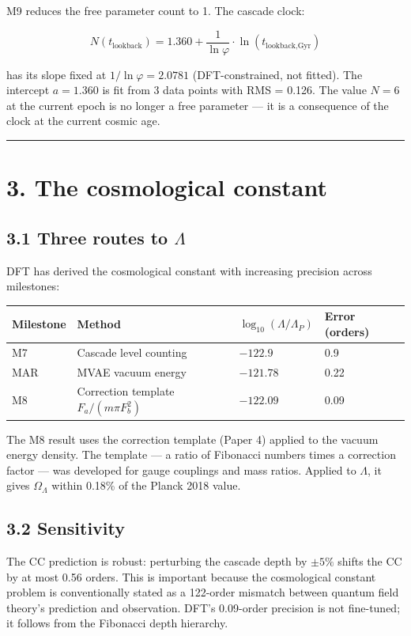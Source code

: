 \documentclass[11pt,a4paper]{article}
\begin{document}
M9 reduces the free parameter count to 1. The cascade clock:

\[N(t_{\text{lookback}}) = 1.360 + \frac{1}{\ln\varphi} \cdot \ln(t_{\text{lookback,Gyr}})\]

has its slope fixed at $1/\ln\varphi = 2.0781$ (DFT-constrained, not fitted). The intercept $a = 1.360$ is fit from 3 data points with RMS = 0.126. The value $N = 6$ at the current epoch is no longer a free parameter — it is a consequence of the clock at the current cosmic age.

\begin{center}\rule{0.5\linewidth}{0.4pt}\end{center}

\section*{3. The cosmological constant}

\subsection*{3.1 Three routes to $\Lambda$}

DFT has derived the cosmological constant with increasing precision across milestones:

\begin{longtable}[]{@{}llll@{}}
\toprule
Milestone & Method & $\log_{10}(\Lambda/\Lambda_P)$ & Error (orders) \\
\midrule\endhead
M7 & Cascade level counting & $-122.9$ & 0.9 \\
MAR & MVAE vacuum energy & $-121.78$ & 0.22 \\
M8 & Correction template $F_a/(m\pi F_b^2)$ & $-122.09$ & 0.09 \\
\bottomrule
\end{longtable}

The M8 result uses the correction template (Paper 4) applied to the vacuum energy density. The template — a ratio of Fibonacci numbers times a correction factor — was developed for gauge couplings and mass ratios. Applied to $\Lambda$, it gives $\Omega_{\Lambda}$ within 0.18\% of the Planck 2018 value.

\subsection*{3.2 Sensitivity}

The CC prediction is robust: perturbing the cascade depth by $\pm 5\%$ shifts the CC by at most 0.56 orders. This is important because the cosmological constant problem is conventionally stated as a 122-order mismatch between quantum field theory's prediction and observation. DFT's 0.09-order precision is not fine-tuned; it follows from the Fibonacci depth hierarchy.
\end{document}
